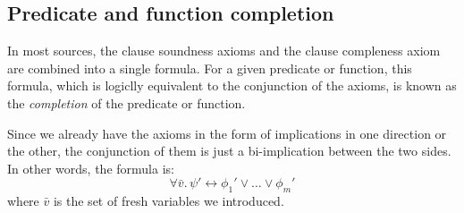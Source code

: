 \subsection{Predicate and function completion}
\label{sec:completion}

In most sources,
the clause soundness axioms and the clause compleness axiom
are combined into a single formula.
For a given predicate or function,
this formula,
which is logiclly equivalent to the conjunction of the axioms,
is known as the \emph{completion} of the predicate or function.

Since we already have the axioms in the form of implications
in one direction or the other,
the conjunction of them is just
a bi-implication between the two sides.
In other words, the formula is:
\[
    \forall \bar{v}.\, \psi' \leftrightarrow \phi_1' \lor \ldots \lor \phi_m'
\]
where $\bar{v}$ is the set of fresh variables we introduced.

